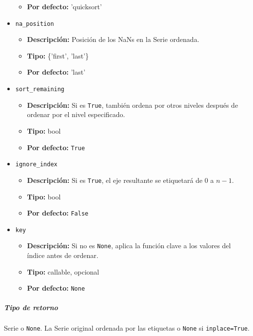 \begin{itemize}
\begin{itemize}
              \item \textbf{Por defecto:} 'quicksort'
          \end{itemize}
    \item \texttt{na\_position}
          \begin{itemize}
              \item \textbf{Descripción:} Posición de los NaNs en la Serie
                    ordenada.
              \item \textbf{Tipo:} \{'first', 'last'\}
              \item \textbf{Por defecto:} 'last'
          \end{itemize}
    \item \texttt{sort\_remaining}
          \begin{itemize}
              \item \textbf{Descripción:} Si es \texttt{True}, también ordena
                    por otros niveles después de ordenar por el nivel especificado.
              \item \textbf{Tipo:} bool
              \item \textbf{Por defecto:} \texttt{True}
          \end{itemize}
    \item \texttt{ignore\_index}
          \begin{itemize}
              \item \textbf{Descripción:} Si es \texttt{True}, el eje
                    resultante se etiquetará de 0 a \( n - 1 \).
              \item \textbf{Tipo:} bool
              \item \textbf{Por defecto:} \texttt{False}
          \end{itemize}
    \item \texttt{key}
          \begin{itemize}
              \item \textbf{Descripción:} Si no es \texttt{None}, aplica la
                    función clave a los valores del índice antes de ordenar.
              \item \textbf{Tipo:} callable, opcional
              \item \textbf{Por defecto:} \texttt{None}
          \end{itemize}
\end{itemize}

\subparagraph{Tipo de retorno}
Serie o \texttt{None}. La Serie original ordenada por las etiquetas o
\texttt{None} si \texttt{inplace=True}.

